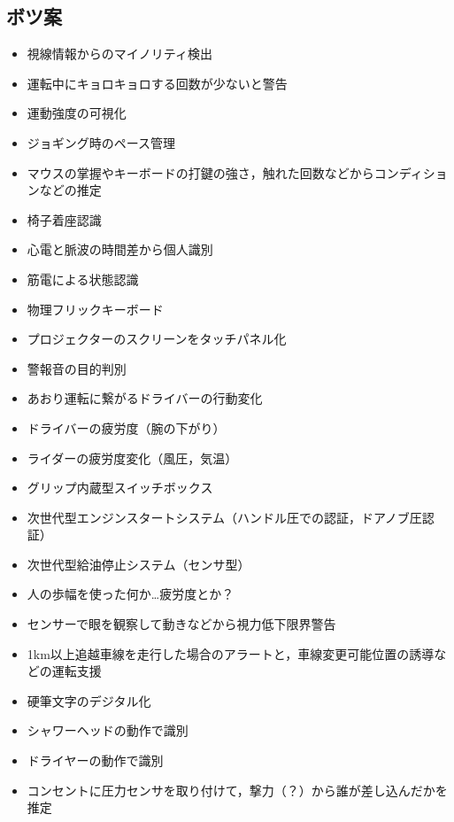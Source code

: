 \documentclass[a4j,10pt]{jarticle}
\begin{document}
\begin{multicols}{2}
  \section{ボツ案}
  \begin{itemize}
    \item 視線情報からのマイノリティ検出
    \item 運転中にキョロキョロする回数が少ないと警告
    \item 運動強度の可視化
    \item ジョギング時のペース管理
    \item マウスの掌握やキーボードの打鍵の強さ，触れた回数などからコンディションなどの推定
    \item 椅子着座認識
    \item 心電と脈波の時間差から個人識別
    \item 筋電による状態認識
    \item 物理フリックキーボード
    \item プロジェクターのスクリーンをタッチパネル化
    \item 警報音の目的判別
    \item あおり運転に繋がるドライバーの行動変化
    \item ドライバーの疲労度（腕の下がり）
    \item ライダーの疲労度変化（風圧，気温）
    \item グリップ内蔵型スイッチボックス
    \item 次世代型エンジンスタートシステム（ハンドル圧での認証，ドアノブ圧認証）
    \item 次世代型給油停止システム（センサ型）
    \item 人の歩幅を使った何か…疲労度とか？
    \item センサーで眼を観察して動きなどから視力低下限界警告
    \item 1km以上追越車線を走行した場合のアラートと，車線変更可能位置の誘導などの運転支援
    \item 硬筆文字のデジタル化
    \item シャワーヘッドの動作で識別
    \item ドライヤーの動作で識別
    \item コンセントに圧力センサを取り付けて，撃力（？）から誰が差し込んだかを推定
  \end{itemize}
\end{multicols}
\end{document}
